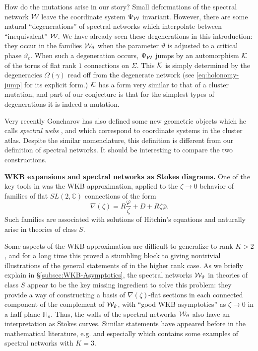 \documentclass[11pt,a4paper]{article}
\def\IC{\mathbb{C}}
\def\CK {{\cal K}}
\def\wnet {{\cal W}}
\def\CK{{\cal K}}
\newcommand{\ti}[1]{\textit{#1}}
\def\IC{\mathbb{C}}
\def\CK {{\cal K}}
\def\wnet {{\cal W}}
\def\CK{{\cal K}}
\begin{document}
How do the mutations arise in our story?
Small deformations of the spectral network $\wnet$ leave the coordinate
system $\Psi_{\wnet}$ invariant.  However,
there are some natural ``degenerations'' of spectral networks
which interpolate between ``inequivalent''  $\wnet$.  We have already seen these degenerations
in this introduction:  they occur in the families $\wnet_\vartheta$ when the parameter
$\vartheta$ is adjusted to a critical
phase $\vartheta_c$.  When such a degeneration occurs,
$\Psi_{\wnet}$ jumps by an automorphism $\CK$
of the torus of flat rank $1$ connections on $\Sigma$.  This $\CK$ is
simply determined by the degeneracies $\Omega(\gamma)$ read off from the
degenerate network (see \eqref{eq:holonomy-jump} for its explicit form.)
$\CK$ has a form very similar to that of a cluster mutation,
and part of our conjecture is that for the simplest types of degenerations
it is indeed a mutation.

Very recently Goncharov has also defined some new geometric objects which he calls \ti{spectral webs} \cite{goncharov},
and which correspond to coordinate systems in the cluster atlas.  Despite the similar nomenclature, this definition is
different from our definition of spectral networks.  It should be interesting to compare the two constructions.

\smallskip
{\bf WKB expansions and spectral networks as Stokes diagrams.} One of the key tools in \cite{Gaiotto:2009hg} was
the WKB approximation, applied to the $\zeta \to 0$ behavior of
families of flat $SL(2,\IC)$ connections
of the form
\begin{equation}
\nabla(\zeta) = R \frac{\varphi}{\zeta} + D +  R \zeta \bar \varphi.
\end{equation}
Such families are associated with solutions of Hitchin's equations \cite{MR89a:32021}
and naturally arise in theories of class $S$.

Some aspects of the WKB approximation are difficult to generalize
to rank $K>2$, and for a long time this proved a stumbling
block to giving nontrivial illustrations of the general statements
of \cite{Gaiotto:2008cd,Gaiotto:2011tf} in the higher
rank case.  As we briefly explain in \S \ref{subsec:WKB-Asymptotics}, the
spectral networks $\wnet_\vartheta$ in theories of class $S$ appear to be the key missing ingredient
to solve this problem:  they provide a way of constructing a basis of $\nabla(\zeta)$-flat sections in
each connected component of the complement of $\wnet_\vartheta$,
with ``good WKB asymptotics'' as $\zeta \to 0$ in a half-plane ${\mathbb H}_\vartheta$.
Thus, the walls of the spectral networks $\wnet_\vartheta$ also have an
interpretation as Stokes curves.  Similar statements have appeared before
in the mathematical literature, e.g. \cite{MR1209700,MR729194} and especially \cite{MR2132714}
which contains some examples of spectral networks with $K=3$.
\end{document}
